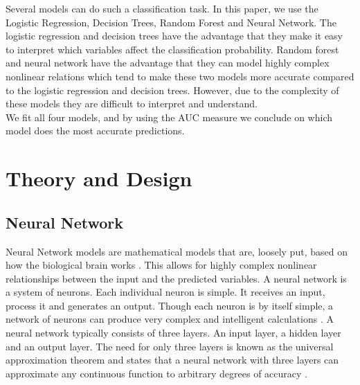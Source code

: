     Several models can do such a classification task. In this paper, we use the Logistic Regression, Decision Trees, Random Forest and Neural Network.
    The logistic regression and decision trees have the advantage that they make it easy to interpret which variables affect the classification probability. Random forest and neural network have the advantage that they can model highly complex nonlinear relations which tend to make these two models more accurate compared to the logistic regression and decision trees. However, due to the complexity of these models they are difficult to interpret and understand.\\
    We fit all four models, and by using the AUC measure we conclude on which model does the most accurate predictions.
     \\

    \newpage
    \pagestyle{fancy}
    \section{Theory and Design}
    
      \subsection{Neural Network}
    \noindent Neural Network models are mathematical models that are, loosely put, based on how the biological brain works \citep{baesens2003using}. This allows for highly complex nonlinear relationships between the input and the predicted variables. 
    A neural network is a system of neurons. Each individual neuron is simple. It receives an input, process it and generates an output. Though each neuron is by itself simple, a network of neurons can produce very complex and intelligent calculations \citep{shiffman2012nature}. 
    A neural network typically consists of three layers. An input layer, a hidden layer and an output layer. The need for only three layers is known as the universal approximation theorem and states that a neural network with three layers can approximate any continuous function to arbitrary degrees of accuracy \citep{hornik1989multilayer}.
    \\
    
   
